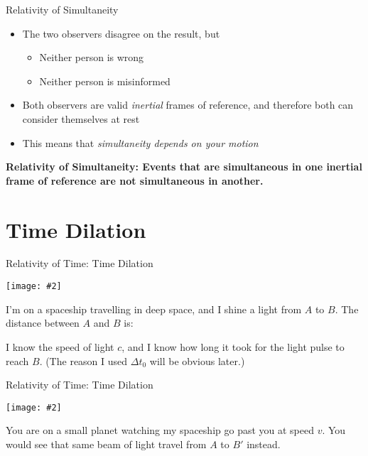 \documentclass[12pt,compress,aspectratio=169]{beamer}
\newcommand{\pic}[2]{\texttt{[image: \#2]}}
\newcommand{\eq}[2]{\vspace{#1}{\Large\begin{displaymath}#2\end{displaymath}}}
\begin{document}
\begin{frame}{Relativity of Simultaneity}
  \begin{itemize}
  \item The two observers disagree on the result, but
    \begin{itemize}
    \item Neither person is wrong
    \item Neither person is misinformed
    \end{itemize}
  \item Both observers are valid \emph{inertial} frames of reference, and
    therefore both can consider themselves at rest
  \item This means that \emph{simultaneity depends on your motion}
  \end{itemize}
  
  \vspace{.2in}\textbf{Relativity of Simultaneity: Events that are simultaneous
    in one inertial frame of reference are not simultaneous in another.}
\end{frame}



\section{Time Dilation}


\begin{frame}{Relativity of Time: Time Dilation}
  \begin{center}
    \pic{.25}{graphics/spaceship1}
  \end{center}
  \vspace{-.15in}I'm on a spaceship travelling in deep space, and I shine a
  light from $A$ to $B$. The distance between $A$ and $B$ is:

  \eq{-.3in}{
    |AB|=c\Delta t_0
  }

  \vspace{-.1in}I know the speed of light $c$, and I know how long it took for
  the light pulse to reach $B$. (The reason I used $\Delta t_0$ will be obvious
  later.)
\end{frame}


\begin{frame}{Relativity of Time: Time Dilation}
  \begin{center}
    \pic{.55}{graphics/spaceship2}
  \end{center}
  You are on a small planet watching my spaceship go past you at speed $v$. You
  would see that same beam of light travel from $A$ to $B'$ instead.
\end{frame}
\end{document}
